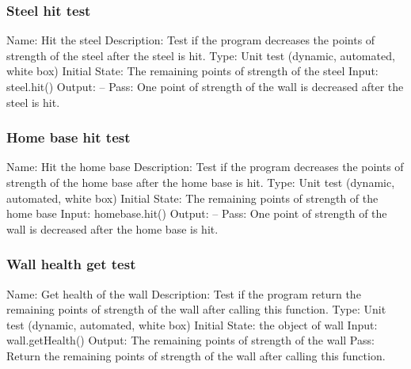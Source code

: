 \documentclass{article}
\begin{document}
\subsubsection{Steel hit test}
Name:  Hit the steel\newline
Description: Test if the program decreases the points of strength of the steel 
after the steel is hit. \newline
Type: Unit test (dynamic, automated, white box) \newline
Initial State:  The remaining points of strength of the steel\newline
Input: steel.hit()\newline
Output: --\newline
Pass:  One point of strength of the wall is decreased after the steel is hit. 
\newline

\subsubsection{Home base hit test}
Name:  Hit the home base\newline
Description: Test if the program decreases the points of strength of the home 
base after the home base is hit. \newline
Type: Unit test (dynamic, automated, white box) \newline
Initial State:  The remaining points of strength of the home base\newline
Input: homebase.hit()\newline
Output: --\newline
Pass:  One point of strength of the wall is decreased after the home base is 
hit. \newline

\subsubsection{Wall health get test}
Name:  Get health of the wall\newline
Description: Test if the program return the remaining points of strength of 
the wall after calling this function. \newline
Type: Unit test (dynamic, automated, white box) \newline
Initial State:  the object of wall\newline
Input: wall.getHealth()\newline
Output: The remaining points of strength of the wall\newline
Pass:  Return the remaining points of strength of the wall after calling this 
function. \newline
\end{document}
